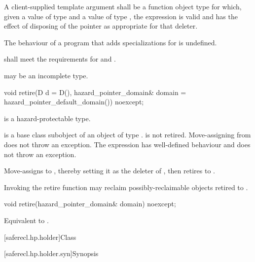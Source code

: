 A client-supplied template argument  shall be a function object type %
for which, given a value  of type  and a value  of type , the expression  is valid and has the effect of disposing of the pointer as appropriate for that deleter.

The behaviour of a program that adds specializations for  is undefined.

{} shall meet the requirements for  and .

{} may be an incomplete type.

\begin{itemdecl}
void retire(D d = D(), hazard_pointer_domain& domain = hazard_pointer_default_domain()) noexcept;
\end{itemdecl}

\begin{itemdescr}

\mandates
{} is a hazard-protectable type.

\expects
{} is a base class subobject of an object  of type .  is not retired.
Move-assigning  from  does not throw an exception. The expression  has well-defined behaviour and does not throw an exception.

\effects 
Move-assigns  to , thereby setting it as the deleter of , then retires 
to .

Invoking the retire function may reclaim possibly-reclaimable objects retired to .

\end{itemdescr}

\begin{itemdecl}
void retire(hazard_pointer_domain& domain) noexcept;
\end{itemdecl}

\begin{itemdescr}

\effects 
Equivalent to .

\end{itemdescr}

[saferecl.hp.holder]{Class }

[saferecl.hp.holder.syn]{Synopsis}

